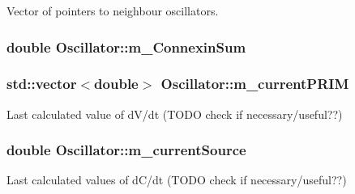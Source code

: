 Vector of pointers to neighbour oscillators. 

\hypertarget{class_oscillator_a952e781ffe848b06b7b511c54f1d090c}{
\subsubsection[{m\+\_\+\+Connexin\+Sum}]{\setlength{\rightskip}{0pt plus 5cm}double Oscillator\+::m\+\_\+\+Connexin\+Sum}}\label{class_oscillator_a952e781ffe848b06b7b511c54f1d090c}
\hypertarget{class_oscillator_aef644a4e5faf78fa338a7a5e739f267c}{
\subsubsection[{m\+\_\+current\+P\+R\+I\+M}]{\setlength{\rightskip}{0pt plus 5cm}std\+::vector$<$double$>$ Oscillator\+::m\+\_\+current\+P\+R\+I\+M}}\label{class_oscillator_aef644a4e5faf78fa338a7a5e739f267c}


Last calculated value of d\+V/dt (T\+O\+D\+O check if necessary/useful??) 

\hypertarget{class_oscillator_a766694982f9a1f8ed7013828089587f7}{
\subsubsection[{m\+\_\+current\+Source}]{\setlength{\rightskip}{0pt plus 5cm}double Oscillator\+::m\+\_\+current\+Source}}\label{class_oscillator_a766694982f9a1f8ed7013828089587f7}


Last calculated values of d\+C/dt (T\+O\+D\+O check if necessary/useful??) 


